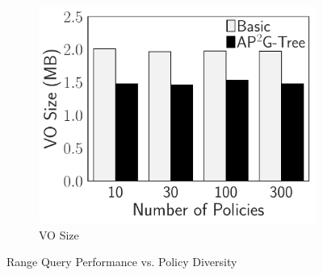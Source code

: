 \begin{figure}[t]
\begin{subfigure}{.33\linewidth}
        \includegraphics[width=\linewidth]{exp-figs/access-control/policy_1_vo.pdf}
        \caption{VO Size}
    \end{subfigure}
    \caption{Range Query Performance vs. Policy Diversity}\label{exp-fig:access-control:policy_1}
\end{figure}
